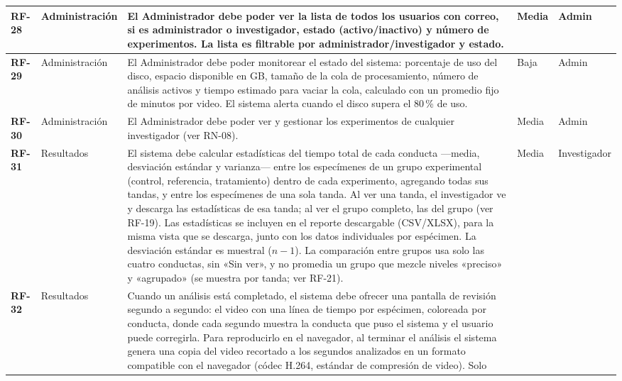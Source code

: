 \begin{longtable}{|>{\bfseries}p{1.1cm}|>{\raggedright}p{2.8cm}|>{\raggedright\arraybackslash}p{5.7cm}|p{1.3cm}|p{2.2cm}|}
RF-28 & Administración
      & El Administrador debe poder ver la lista de todos los usuarios con correo,
        si es administrador o investigador, estado (activo/inactivo)
        y número de experimentos. La lista es filtrable por
        administrador/investigador y estado.
      & Media & Admin \\
\hline
RF-29 & Administración
      & El Administrador debe poder monitorear el estado del sistema: porcentaje de
        uso del disco, espacio disponible en GB, tamaño de la cola de procesamiento,
        número de análisis activos y tiempo estimado para vaciar la cola, calculado con un promedio fijo de minutos por video. El sistema alerta cuando el disco
        supera el 80\,\% de uso.
      & Baja & Admin \\
\hline
RF-30 & Administración
      & El Administrador debe poder ver y gestionar los experimentos de cualquier
        investigador (ver RN-08).
      & Media & Admin \\
\hline
RF-31 & Resultados
      & El sistema debe calcular estadísticas del tiempo total de cada conducta
        ---media, desviación estándar y varianza--- entre los especímenes de un grupo
        experimental (control, referencia, tratamiento) dentro de cada experimento,
        agregando todas sus tandas, y entre los especímenes de una sola tanda. Al ver
        una tanda, el investigador ve y descarga las estadísticas de esa tanda; al ver
        el grupo completo, las del grupo (ver RF-19). Las estadísticas se incluyen en
        el reporte descargable (CSV/XLSX), para la misma vista que se descarga, junto
        con los datos individuales por espécimen. La desviación estándar es muestral ($n-1$). La comparación entre grupos usa solo las cuatro conductas, sin «Sin ver», y no promedia un grupo que mezcle niveles «preciso» y «agrupado» (se muestra por tanda; ver RF-21).
      & Media & Investigador \\
\hline
RF-32 & Resultados
      & Cuando un análisis está completado, el sistema debe ofrecer una pantalla de
        revisión segundo a segundo: el video con una línea de tiempo por espécimen,
        coloreada por conducta, donde cada segundo muestra la conducta que puso el
        sistema y el usuario puede corregirla. Para reproducirlo en el navegador, al
        terminar el análisis el sistema genera una copia del video recortado a los
        segundos analizados en un formato compatible con el navegador (códec H.264, estándar de compresión de video). Solo

\end{longtable}
